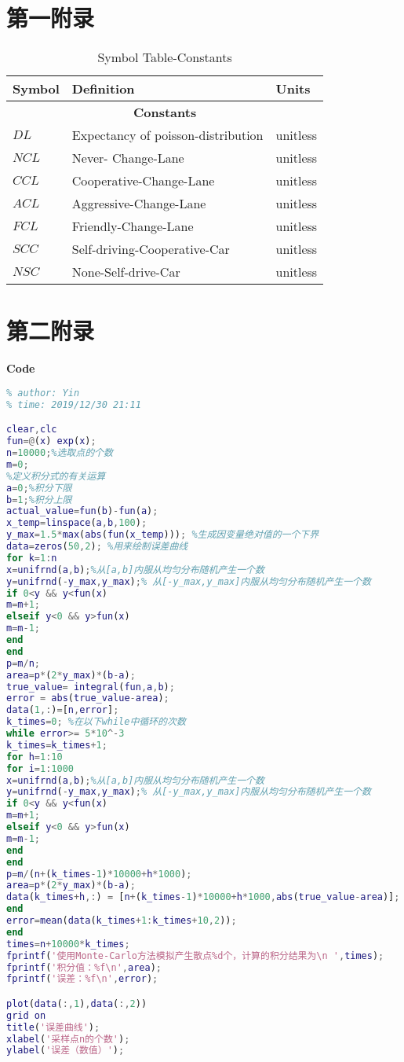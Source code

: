 \newpage
\appendix

\section{第一附录}



\begin{table}[H]
\caption{Symbol Table-Constants}
\centering
\begin{tabular}{lll}
\toprule
Symbol & Definition  & Units\\
\midrule[2pt]
\multicolumn{3}{c}{\textbf{Constants} }\\
$DL$&Expectancy of poisson-distribution &  unitless \\
$NCL$ &Never- Change-Lane& unitless\\
$CCL$&Cooperative-Change-Lane& unitless\\
$ACL$&Aggressive-Change-Lane& unitless\\
$FCL$&Friendly-Change-Lane& unitless\\
$SCC$&Self-driving-Cooperative-Car& unitless\\
$NSC$&None-Self-drive-Car& unitless\\
\bottomrule
\end{tabular}
\end{table}


\section{第二附录}
\textcolor[rgb]{0.98,0.00,0.00}{\textbf{Code}}
\begin{lstlisting}[language=matlab]
% Auto-fit for Monto_Caolo method.
% author: Yin
% time: 2019/12/30 21:11

clear,clc
fun=@(x) exp(x);
n=10000;%选取点的个数
m=0;
%定义积分式的有关运算
a=0;%积分下限
b=1;%积分上限
actual_value=fun(b)-fun(a);
x_temp=linspace(a,b,100);
y_max=1.5*max(abs(fun(x_temp))); %生成因变量绝对值的一个下界
data=zeros(50,2); %用来绘制误差曲线
for k=1:n
x=unifrnd(a,b);%从[a,b]内服从均匀分布随机产生一个数
y=unifrnd(-y_max,y_max);% 从[-y_max,y_max]内服从均匀分布随机产生一个数
if 0<y && y<fun(x)
m=m+1;
elseif y<0 && y>fun(x)
m=m-1;
end
end
p=m/n;
area=p*(2*y_max)*(b-a);
true_value= integral(fun,a,b);
error = abs(true_value-area);
data(1,:)=[n,error];
k_times=0; %在以下while中循环的次数
while error>= 5*10^-3
k_times=k_times+1;
for h=1:10
for i=1:1000
x=unifrnd(a,b);%从[a,b]内服从均匀分布随机产生一个数
y=unifrnd(-y_max,y_max);% 从[-y_max,y_max]内服从均匀分布随机产生一个数
if 0<y && y<fun(x)
m=m+1;
elseif y<0 && y>fun(x)
m=m-1;
end
end
p=m/(n+(k_times-1)*10000+h*1000);
area=p*(2*y_max)*(b-a);
data(k_times+h,:) = [n+(k_times-1)*10000+h*1000,abs(true_value-area)];
end
error=mean(data(k_times+1:k_times+10,2));
end
times=n+10000*k_times;
fprintf('使用Monte-Carlo方法模拟产生散点%d个，计算的积分结果为\n ',times);
fprintf('积分值：%f\n',area);
fprintf('误差：%f\n',error);

plot(data(:,1),data(:,2))
grid on
title('误差曲线');
xlabel('采样点n的个数');
ylabel('误差（数值）');
\end{lstlisting}

